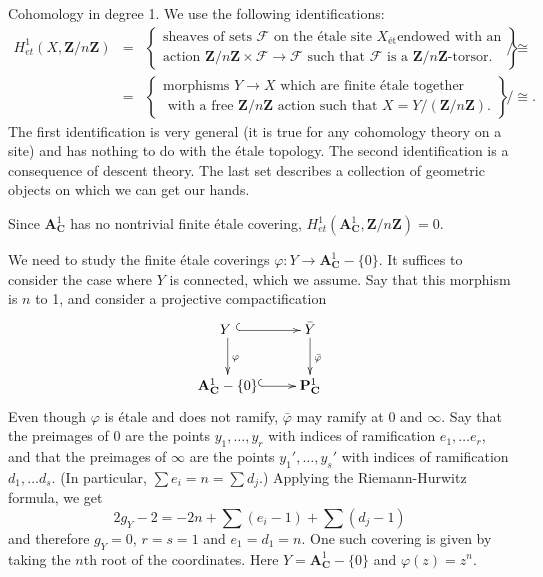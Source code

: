 \medskip\noindent
Cohomology in degree 1. We use the following identifications:
\begin{eqnarray*}
H_{et}^1 (X, \mathbf{Z}/n\mathbf{Z}) & = & \left\{
\begin{matrix}
\text{sheaves of sets $\mathcal{F}$ on the \'etale site $X_{\text{\'et}}$
endowed with an} \\
\text{action $\mathbf{Z}/n\mathbf{Z} \times \mathcal{F} \to \mathcal{F}$ such
that $\mathcal{F}$ is a $\mathbf{Z}/n\mathbf{Z}$-torsor.}
\end{matrix}
\right\}
\Big/ \cong
\\
& = & \left\{
\begin{matrix}
\text{morphisms $Y \to X$ which are finite \'etale together} \\
\text{ with a free $\mathbf{Z}/n\mathbf{Z}$ action such that $X = Y
/(\mathbf{Z}/n\mathbf{Z})$.}
\end{matrix}
\right\}
\Big/ \cong.
\end{eqnarray*}
The first identification is very general (it is true for any cohomology theory
on a site) and has nothing to do with the \'etale topology. The second
identification is a consequence of descent theory. The last set describes a
collection of geometric objects on which we can get our hands.

\medskip\noindent
Since $\mathbf{A}^1_\mathbf{C}$ has no nontrivial finite \'etale covering,
$H_{et}^1 (\mathbf{A}^1_\mathbf{C}, \mathbf{Z}/n\mathbf{Z}) = 0$.

\medskip\noindent
We need to study the finite \'etale coverings $\varphi: Y \to
\mathbf{A}^1_\mathbf{C}-\{0\}$. It suffices to consider the case where $Y$ is
connected, which we assume. Say that this morphism is $n$ to 1, and consider a
projective compactification
$$
\xymatrix{
{Y\ } \ar@{^{(}->}[r] \ar^{\varphi}[d] & {\bar Y} \ar^{\bar\varphi}[d] \\
{\mathbf{A}^1_\mathbf{C}-\{0\}} \ar@{^{(}->}[r] &{\mathbf{P}^1_\mathbf{C}}
}
$$
Even though $\varphi$ is \'etale and does not ramify, $\bar{\varphi}$ may
ramify at 0 and $\infty$. Say that the preimages of 0 are the points $y_1,
\dots, y_r$ with indices of ramification $e_1, \dots e_r$, and that the
preimages of $\infty$ are the points $y_1', \dots, y_s'$ with indices of
ramification $d_1, \dots d_s$. (In particular, $\sum e_i = n = \sum d_j$.)
Applying the Riemann-Hurwitz formula, we get
$$
2 g_Y - 2 = -2n + \sum (e_i - 1) + \sum (d_j - 1)
$$
and therefore $g_Y = 0$, $r=s=1$ and $e_1 = d_1 = n$. One such covering is
given by taking the $n$th root of the coordinates. Here $Y =
{\mathbf{A}^1_\mathbf{C}-\{0\}}$ and $\varphi (z) = z^n$.

